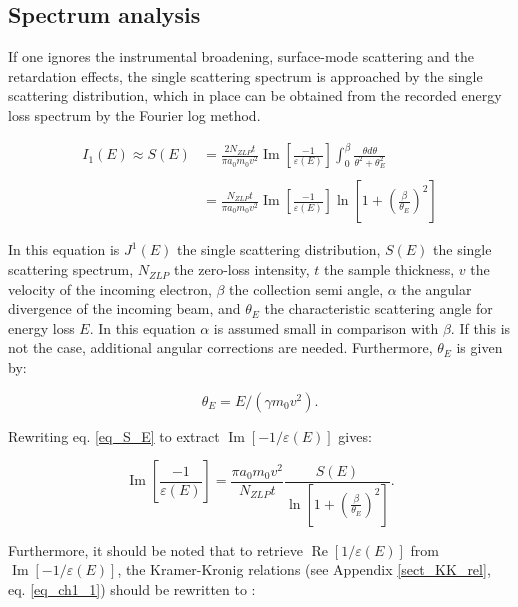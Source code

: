 \newpage

\subsection{Spectrum analysis}\label{sect_K_K}
If one ignores the instrumental broadening, surface-mode scattering and the retardation effects, the single scattering spectrum is approached by the single scattering distribution, which in place can be obtained from the recorded energy loss spectrum by the Fourier log method. \cite{egerton_book}

\begin{equation}\label{eq_S_E}
\begin{aligned}
I_{1}(E)  \approx S(E) &=\frac{2 N_{ZLP} t}{\pi a_{0} m_{0} v^{2}} \operatorname{Im}\left[\frac{-1}{\varepsilon(E)}\right] \int_{0}^{\beta} \frac{\theta d \theta}{\theta^{2}+\theta_{E}^{2}} \\
\\
&=\frac{N_{ZLP} t}{\pi a_{0} m_{0} v^{2}} \operatorname{Im}\left[\frac{-1}{\varepsilon(E)}\right] \ln \left[1+\left(\frac{\beta}{\theta_{E}}\right)^{2}\right]
\end{aligned}
\end{equation}

In this equation is $J^1(E)$ the single scattering distribution, $S(E)$ the single scattering spectrum, $N_{ZLP}$ the zero-loss intensity, $t$ the sample thickness, $v$ the velocity of the incoming electron, $\beta$ the collection semi angle, $\alpha$ the angular divergence of the incoming beam, and $\theta_E$ the characteristic scattering angle for energy loss $E$. In this equation $\alpha$ is assumed small in comparison with $\beta$. If this is not the case, additional angular corrections are needed. Furthermore, $\theta_E$ is given by:

\begin{equation} \label{eq_th_E}
    \theta_E = E/(\gamma m_0v^2) .
\end{equation}


Rewriting eq. \eqref{eq_S_E} to extract $\operatorname{Im}\left[-1/\varepsilon(E)\right]$ gives:

\begin{equation}
    \operatorname{Im}\left[\frac{-1}{\varepsilon(E)}\right] = \frac{\pi a_{0} m_{0} v^{2}}{N_{ZLP} t} \frac{S(E)}{\ln \left[1+\left(\frac{\beta}{\theta_{E}}\right)^{2}\right]}. 
\end{equation}


Furthermore, it should be noted that to retrieve $\operatorname{Re}\left[1/\varepsilon(E)\right]$ from $\operatorname{Im}\left[-1/\varepsilon(E)\right]$, the Kramer-Kronig relations (see Appendix \ref{sect_KK_rel}, eq. \eqref{eq_ch1_1}) should be rewritten to \cite{Dapor2017}:

